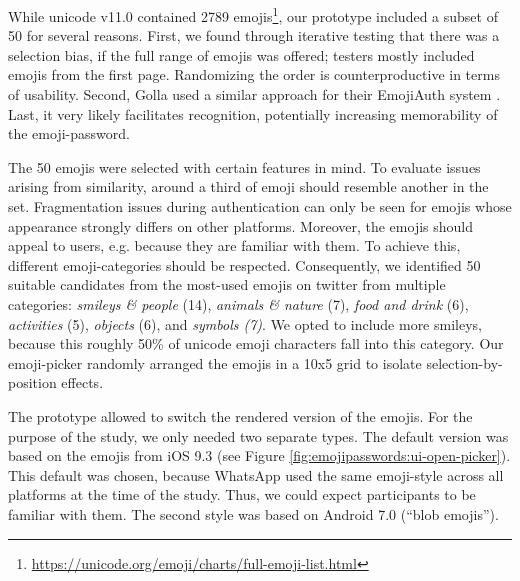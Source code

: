 While unicode v11.0 contained 2789 emojis\footnote{\label{foot:full-list-of-emojis}\url{https://unicode.org/emoji/charts/full-emoji-list.html}}, our prototype included a subset of 50 for several reasons. First, we found through iterative testing that there was a selection bias, if the full range of emojis was offered; testers mostly included emojis from the first page. Randomizing the order is counterproductive in terms of usability. Second, Golla \etal used a similar approach for their EmojiAuth system \cite{Golla2017EmojiAuth, Kraus2017Emoji}. Last, it very likely facilitates recognition, potentially increasing memorability of the emoji-password.

The 50 emojis were selected with certain features in mind. To evaluate issues arising from similarity, around a third of emoji should resemble another in the set. Fragmentation issues during authentication can only be seen for emojis whose appearance strongly differs on other platforms. Moreover, the emojis should appeal to users, e.g. because they are familiar with them. To achieve this, different emoji-categories should be respected. Consequently, we identified 50 suitable candidates from the most-used emojis on twitter from multiple categories: \textit{smileys \& people} (14), \textit{animals \& nature} (7), \textit{food and drink} (6), \textit{activities} (5), \textit{objects} (6), and \textit{symbols (7)}. We opted to include more smileys, because this roughly 50\% of unicode emoji characters fall into this category. Our emoji-picker randomly arranged the emojis in a 10x5 grid to isolate selection-by-position effects. 

The prototype allowed to switch the rendered version of the emojis. For the purpose of the study, we only needed two separate types. The default version was based on the emojis from iOS 9.3 (see Figure \ref{fig:emojipasswords:ui-open-picker}). This default was chosen, because WhatsApp used the same emoji-style across all platforms at the time of the study. Thus, we could expect participants to be familiar with them. The second style was based on Android 7.0 (``blob emojis''). 

